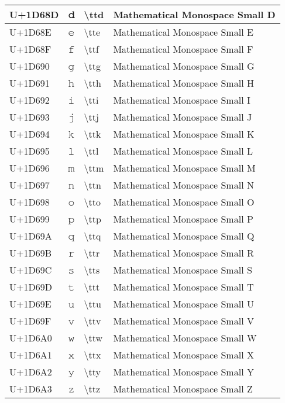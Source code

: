 \begin{table}[h]
\begin{tabulary}{\linewidth}{|L|L|L|L|}
\hline
U+1D68D & 𝚍 & {\textbackslash}ttd & Mathematical Monospace Small D \\
\hline
U+1D68E & 𝚎 & {\textbackslash}tte & Mathematical Monospace Small E \\
\hline
U+1D68F & 𝚏 & {\textbackslash}ttf & Mathematical Monospace Small F \\
\hline
U+1D690 & 𝚐 & {\textbackslash}ttg & Mathematical Monospace Small G \\
\hline
U+1D691 & 𝚑 & {\textbackslash}tth & Mathematical Monospace Small H \\
\hline
U+1D692 & 𝚒 & {\textbackslash}tti & Mathematical Monospace Small I \\
\hline
U+1D693 & 𝚓 & {\textbackslash}ttj & Mathematical Monospace Small J \\
\hline
U+1D694 & 𝚔 & {\textbackslash}ttk & Mathematical Monospace Small K \\
\hline
U+1D695 & 𝚕 & {\textbackslash}ttl & Mathematical Monospace Small L \\
\hline
U+1D696 & 𝚖 & {\textbackslash}ttm & Mathematical Monospace Small M \\
\hline
U+1D697 & 𝚗 & {\textbackslash}ttn & Mathematical Monospace Small N \\
\hline
U+1D698 & 𝚘 & {\textbackslash}tto & Mathematical Monospace Small O \\
\hline
U+1D699 & 𝚙 & {\textbackslash}ttp & Mathematical Monospace Small P \\
\hline
U+1D69A & 𝚚 & {\textbackslash}ttq & Mathematical Monospace Small Q \\
\hline
U+1D69B & 𝚛 & {\textbackslash}ttr & Mathematical Monospace Small R \\
\hline
U+1D69C & 𝚜 & {\textbackslash}tts & Mathematical Monospace Small S \\
\hline
U+1D69D & 𝚝 & {\textbackslash}ttt & Mathematical Monospace Small T \\
\hline
U+1D69E & 𝚞 & {\textbackslash}ttu & Mathematical Monospace Small U \\
\hline
U+1D69F & 𝚟 & {\textbackslash}ttv & Mathematical Monospace Small V \\
\hline
U+1D6A0 & 𝚠 & {\textbackslash}ttw & Mathematical Monospace Small W \\
\hline
U+1D6A1 & 𝚡 & {\textbackslash}ttx & Mathematical Monospace Small X \\
\hline
U+1D6A2 & 𝚢 & {\textbackslash}tty & Mathematical Monospace Small Y \\
\hline
U+1D6A3 & 𝚣 & {\textbackslash}ttz & Mathematical Monospace Small Z \\

\end{tabulary}
\end{table}
